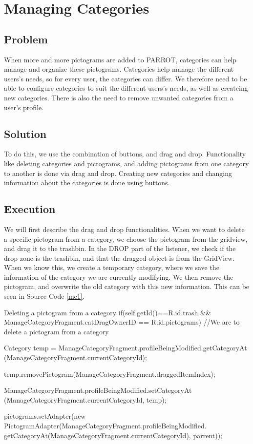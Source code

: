 \section{Managing Categories} %
\label{mc}
\subsection*{Problem}
When more and more pictograms are added to PARROT, categories can help manage and organize these pictograms. 
Categories help manage the different users's needs, so for every user, the categories can differ. 
We therefore need to be able to configure categories to suit the different users's needs, as well as createing new categories. 
There is also the need to remove unwanted categories from a user's profile.


\subsection*{Solution}
To do this, we use the combination of buttons, and drag and drop. 
Functionality like deleting categories and pictograms, and adding pictograms from one category to another is done via drag and drop. 
Creating new categories and changing information about the categories is done using buttons. 


\subsection*{Execution}
We will first describe the drag and drop functionalities. 
When we want to delete a specific pictogram from a category, we choose the pictogram from the gridview, and drag it to the trashbin. 
In the DROP part of the listener, we check if the drop zone is the trashbin, and that the dragged object is from the GridView.
When we know this, we create a temporary category, where we save the information of the category we are currently modifying. We then remove the pictogram, and overwrite the old category with this new information.
This can be seen in Source Code \ref{mc1}.

\begin{source}[{mc1}]{Deleting a pictogram from a category}
if(self.getId()==R.id.trash && ManageCategoryFragment.catDragOwnerID == R.id.pictograms) //We are to delete a pictogram from a category
				{
					Category temp = ManageCategoryFragment.profileBeingModified.getCategoryAt
						(ManageCategoryFragment.currentCategoryId);
					
					temp.removePictogram(ManageCategoryFragment.draggedItemIndex);
					
					ManageCategoryFragment.profileBeingModified.setCategoryAt
						(ManageCategoryFragment.currentCategoryId, temp);
					
					pictograms.setAdapter(new PictogramAdapter(ManageCategoryFragment.profileBeingModified.
						getCategoryAt(ManageCategoryFragment.currentCategoryId), parrent));
				}
\end{source}

